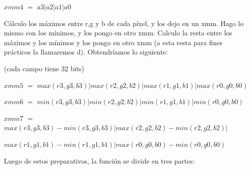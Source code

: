 \documentclass[a4paper]{article}
\begin{document}
\vspace*{0.3cm}

 $xmm4$ $=$ $a3|a2|a1|a0$

\vspace*{0.3cm}

Cálculo los máximos entre r,g y b de cada píxel, y los dejo en un xmm. Hago lo mismo con los mínimos, y los pongo en otro xmm. Calculo la resta entre los máximos y los mínimos y los pongo en otro xmm (a esta resta para fines prácticos la llamaremos d). Obtendríamos lo siguiente:

 \vspace*{0.3cm}

(cada campo tiene 32 bits)

\vspace*{0.3cm}

 $xmm5$ $=$ $max(r3,g3,b3)|max(r2,g2,b2)|max(r1,g1,b1)|max(r0,g0,b0)$

\vspace*{0.3cm}

 $xmm6$ $=$ $min(r3,g3,b3)|min(r2,g2,b2)|min(r1,g1,b1)|min(r0,g0,b0)$

\vspace*{0.3cm}

 $xmm7$ $=$ $max(r3,g3,b3)-min(r3,g3,b3)|max(r2,g2,b2)-min(r2,g2,b2)|$
 
 \hspace*{1.45cm}$max(r1,g1,b1)-min(r1,g1,b1)|max(r0,g0,b0)-min(r0,g0,b0)$

\vspace*{0.3cm}


Luego de estos preparativos, la función se divide en tres partes:
\end{document}
